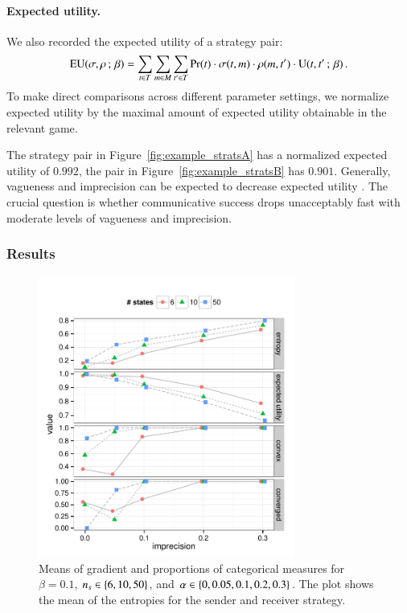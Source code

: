 \documentclass[fleqn,reqno,10pt]{article}
\newcommand{\impairment}{\ensuremath{\alpha}} %
\newcommand{\toler}{\ensuremath{\beta}} %
\newcommand{\ns}{\ensuremath{n_s}} %
\begin{document}
\paragraph{Expected utility.} We also recorded the expected utility of
a strategy pair:
\begin{align*}
  \EU(\Sstrat,\Rstrat \myts ; \myts \toler) = \sum_{\state \in
    \States} \sum_{\messg \in \Messgs} \sum_{\state' \in \States}
  \Pr(\state) \cdot \Sstrat(\state, \messg) \cdot \Rstrat(\messg,
  \state') \cdot \Util(\state,\state' \myts ; \myts \toler)\,.
\end{align*}
To make direct comparisons across different parameter settings, we
normalize expected utility by the maximal amount of expected utility
obtainable in the relevant game. 

The strategy pair in Figure~\ref{fig:example_stratsA} has a normalized
expected utility of $0.992$, the pair in
Figure~\ref{fig:example_stratsB} has $0.901$. Generally, vagueness and
imprecision can be expected to decrease expected utility
\citep[c.f.][]{Lipman2009:Why-is-Language}. The crucial question is whether
communicative success drops unacceptably fast with moderate levels of
vagueness and imprecision.

\subsubsection{Results}

\begin{figure}[t]
  \centering
  
  \includegraphics[width=0.75\textwidth]{plots/MeanMetrics3.pdf}

  \caption{Means of gradient and proportions of categorical measures
    for $\toler = 0.1$, $\ns \in \set{6, 10, 50}$, and $\impairment
    \in \set{0, 0.05, 0.1, 0.2, 0.3}$. The plot shows the mean of the
    entropies for the sender and receiver strategy.}
  \label{fig:MeanMetrics}
\end{figure}
\end{document}
